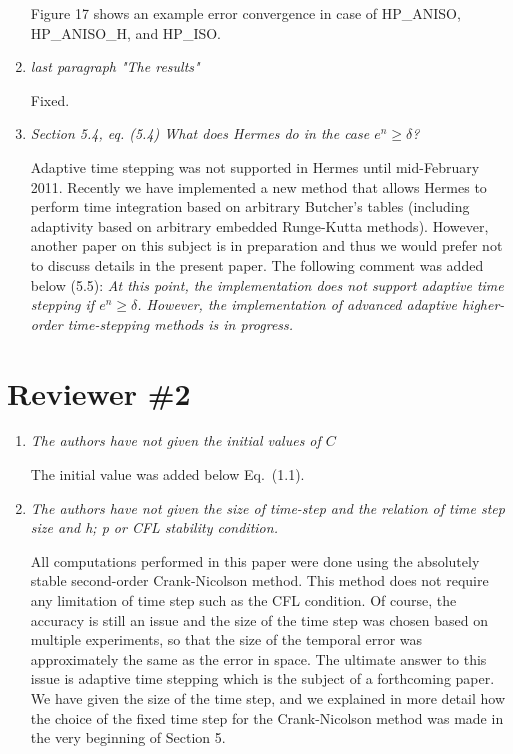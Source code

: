 \documentclass[mathpazo]{cicp}
\begin{document}
\begin{enumerate}
Figure 17 shows an example error convergence in case of HP\_ANISO, HP\_ANISO\_H, and HP\_ISO.

\item \emph{last paragraph "The results"}

Fixed.

\item \emph{Section 5.4, eq. (5.4) What does Hermes do in the case $e^n\geq\delta$?}

Adaptive time stepping was not supported in Hermes until mid-February 2011. Recently we have 
implemented a new method that allows Hermes to perform time integration based on arbitrary Butcher's 
tables (including adaptivity based on arbitrary embedded Runge-Kutta methods). However, another paper on this subject 
is in preparation and thus we would prefer not to discuss details in the present paper. 
The following comment was added below (5.5): \emph{At this point, the implementation does not support
adaptive time stepping if $e^n\geq \delta$. However, the implementation 
of advanced adaptive higher-order time-stepping methods is in progress.}

\end{enumerate}

\section{Reviewer \#2}

\begin{enumerate}

\item \emph{The authors have not given the initial values of $C$}

The initial value was added below Eq.~(1.1).

\item \emph{The authors have not given the size of time-step and the relation
of time step size and h; p or CFL stability condition.}

All computations performed in this paper were done using the absolutely stable 
second-order Crank-Nicolson method. This method does not require any 
limitation of time step such as the CFL condition. Of course, the 
accuracy is still an issue and the size of the time step was chosen 
based on multiple experiments, so that the size of the temporal error 
was approximately the same as the error in space. The ultimate answer 
to this issue is adaptive time stepping which is the subject of a forthcoming 
paper. We have given the size of the time step, and 
we explained in more detail how the choice of the fixed time step
for the Crank-Nicolson method was made in the very beginning
of Section 5.

\end{enumerate}
\end{document}
